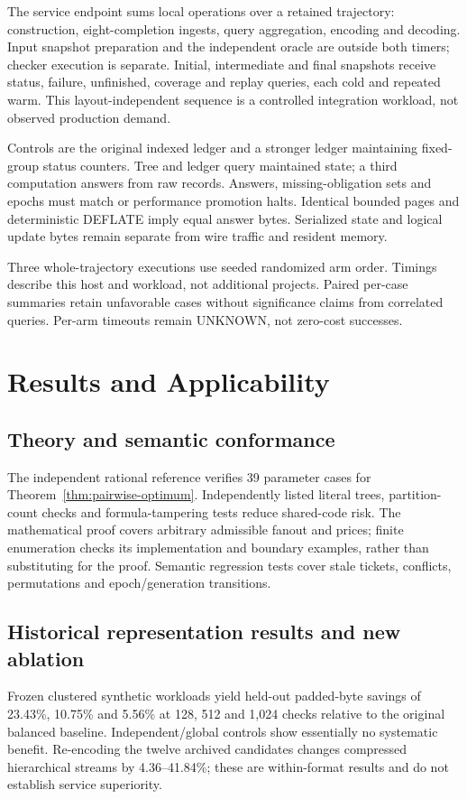 \documentclass[10pt,journal,compsoc]{IEEEtran}
\theoremstyle{definition}\newtheorem{definition}[theorem]{Definition}
\begin{document}
The service endpoint sums local operations over a retained trajectory:
construction, eight-completion ingests, query aggregation, encoding and
decoding. Input snapshot preparation and the independent oracle are outside
both timers; checker execution is separate. Initial, intermediate and final
snapshots receive status, failure, unfinished, coverage and replay queries,
each cold and repeated warm. This layout-independent sequence is a controlled
integration workload, not observed production demand.

Controls are the original indexed ledger and a stronger ledger maintaining
fixed-group status counters. Tree and ledger query maintained state; a third
computation answers from raw records. Answers, missing-obligation sets and
epochs must match or performance promotion halts. Identical bounded pages
and deterministic DEFLATE imply equal answer bytes. Serialized state and
logical update bytes remain separate from wire traffic and resident memory.

Three whole-trajectory executions use seeded randomized arm order. Timings
describe this host and workload, not additional projects. Paired per-case
summaries retain unfavorable cases without significance claims from correlated
queries. Per-arm timeouts remain $\mathrm{UNKNOWN}$, not zero-cost successes.



\section{Results and Applicability}\label{sec:jresults}
\subsection{Theory and semantic conformance}
The independent rational reference verifies 39 parameter cases for
Theorem~\ref{thm:pairwise-optimum}. Independently listed literal trees,
partition-count checks and formula-tampering tests reduce shared-code risk.
The mathematical proof covers arbitrary admissible fanout and prices;
finite enumeration checks its implementation and boundary examples, rather
than substituting for the proof. Semantic regression tests cover stale
tickets, conflicts, permutations and epoch/generation transitions.

\subsection{Historical representation results and new ablation}
Frozen clustered synthetic workloads yield held-out padded-byte savings of
23.43\%, 10.75\% and 5.56\% at 128, 512 and 1,024 checks relative to the
original balanced baseline. Independent/global controls show essentially
no systematic benefit. Re-encoding the twelve archived candidates changes
compressed hierarchical streams by 4.36--41.84\%; these are within-format
results and do not establish service superiority.
\end{document}
